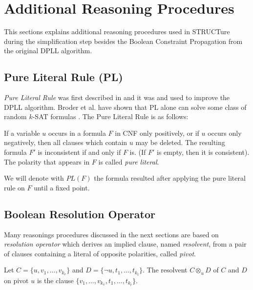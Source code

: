 \section{Additional Reasoning Procedures}

This sections explains additional reasoning procedures used in
STRUCTure during the simplification step besides the Boolean
Constraint Propagation from the original DPLL algorithm.

\subsection{Pure Literal Rule (PL)}
\label{ssec:pl}

\emph{Pure Literal Rule} was first described in
\cite{Davis:1962:MPT:368273.368557} and it was and used to
improve the DPLL algorithm. Broder et al. have shown that
PL alone can solve some class of random $k$-SAT formulas
\cite{Broder:1993:SMS:313559.313794}.  The Pure Literal Rule is
as follows:

\begin{mydef}
  If a variable $u$ occurs in a formula $F$ in CNF only positively, or
  if $u$ occurs only negatively, then all clauses which contain $u$
  may be deleted. The resulting formula $F'$ is inconsistent
  if and only if $F$ is. (If $F'$ is empty, then it is consistent).
  The polarity that appears in $F$ is called \emph{pure literal}.
\end{mydef}

We will denote with $PL(F)$ the formula resulted after applying
the pure literal rule on $F$ until a fixed point.


\subsection{Boolean Resolution Operator}
\label{ssec:resolution}

Many reasonings procedures discussed in the next sections are based
on \emph{resolution operator} \cite{Robinson:1965:MLB:321250.321253}
which derives an implied clause, named \emph{resolvent}, from
a pair of clauses containing a literal of opposite polarities,
called \emph{pivot}.

\begin{mydef}
  \label{mydef:resolution}
  Let $C = \{ u, v_1, \ldots, v_{k_v} \}$ and $D = \{ \neg u,
  t_1, \ldots, t_{k_t} \}$. The resolvent $C \otimes_{u} D$ of $C$
  and $D$ on pivot $u$ is the clause $\{v_1, \ldots, v_{k_v}, t_1,
  \ldots, t_{k_t}\}$.
\end{mydef}


